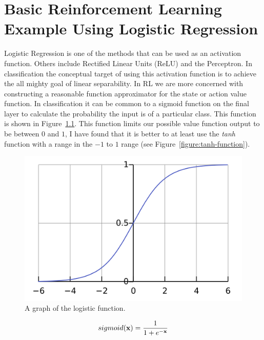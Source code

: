 
\chapter{Basic Reinforcement Learning Example Using Logistic Regression }
\label{chapter:logistic-regression}

Logistic Regression is one of the methods that can be used as an activation function. Others include Rectified Linear Units (ReLU) and the Perceptron. In classification the conceptual target of using this activation function is to achieve the all mighty goal of linear separability. In RL we are more concerned with constructing a reasonable function approximator for the state or action value function. In classification it can be common to a sigmoid function on the final layer to calculate the probability the input is of a particular class. This function is shown in Figure~\ref{figure:logistic-function}. This function limits our possible value function output to be between $0$ and $1$, I have found that it is better to at least use the \textit{tanh} function with a range in the $-1$ to $1$ range (see Figure~\ref{figure:tanh-function}).

\begin{figure}
	\label{figure:logistic-function}
	\includegraphics[width=0.95\linewidth]{../images/Logistic-curve.png}
	\caption{A graph of the logistic function.}
\end{figure}

\begin{equation}
	sigmoid(\textbf{x})=\frac{1}{1+e^{-\textbf{x}}}
\end{equation}  

